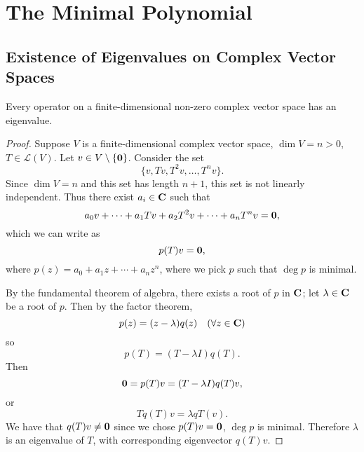 \section{The Minimal Polynomial}
\subsection{Existence of Eigenvalues on Complex Vector Spaces}
\begin{theorem}
Every operator on a finite-dimensional non-zero complex vector space has an eigenvalue.
\end{theorem}

\begin{proof}
Suppose $V$ is a finite-dimensional complex vector space, $\dim V=n>0$, $T\in\mathcal{L}(V)$. Let $v\in V\setminus\{\vb{0}\}$. Consider the set
\[\{v,Tv,T^2v,\dots,T^nv\}.\]
Since $\dim V=n$ and this set has length $n+1$, this set is not linearly independent. Thus there exist $a_i\in\mathbf C$ such that
\[a_0v+\cdots+a_1Tv+a_2T^2v+\cdots+a_nT^nv=\vb{0},\]
which we can write as
\[p(T)v=\vb{0},\]
where $p(z)=a_0+a_1z+\cdots+a_nz^n$, where we pick $p$ such that $\deg p$ is minimal.

By the fundamental theorem of algebra, there exists a root of $p$ in $\mathbf C$; let $\lambda\in\mathbf C$ be a root of $p$. Then by the factor theorem,
\[p(z)=(z-\lambda)q(z)\quad(\forall z\in\mathbf C)\]
so
\[p(T)=(T-\lambda I)q(T).\]
Then 
\[\vb{0}=p(T)v=(T-\lambda I)q(T)v,\]
or
\[Tq(T)v=\lambda qT(v).\]
We have that $q(T)v\neq\vb{0}$ since we chose $p(T)v=\vb{0}$, $\deg p$ is minimal. Therefore $\lambda$ is an eigenvalue of $T$, with corresponding eigenvector $q(T)v$.
\end{proof}

